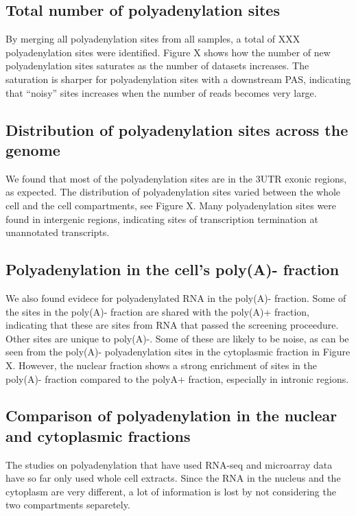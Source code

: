 \subsection{Total number of polyadenylation sites}
By merging all polyadenylation sites from all samples, a total of XXX
polyadenylation sites were identified. Figure X shows how the number of new
polyadenylation sites saturates as the number of datasets increases. The
saturation is sharper for polyadenylation sites with a downstream PAS,
indicating that ``noisy'' sites increases when the number of reads becomes very
large.

\subsection{Distribution of polyadenylation sites across the genome}
We found that most of the polyadenylation sites are in the 3\p UTR exonic
regions, as expected. The distribution of polyadenylation sites varied between
the whole cell and the cell compartments, see Figure X. Many polyadenylation
sites were found in intergenic regions, indicating sites of transcription
termination at unannotated transcripts.

\subsection{Polyadenylation in the cell's poly(A)- fraction}
We also found evidece for polyadenylated RNA in the poly(A)- fraction. Some of
the sites in the poly(A)- fraction are shared with the poly(A)+ fraction,
indicating that these are sites from RNA that passed the screening proceedure.
Other sites are unique to poly(A)-. Some of these are likely to be noise, as
can be seen from the poly(A)- polyadenylation sites in the cytoplasmic fraction
in Figure X. However, the nuclear fraction shows a strong enrichment of sites
in the poly(A)- fraction compared to the polyA+ fraction, especially in 
intronic regions.

\subsection{Comparison of polyadenylation in the nuclear and cytoplasmic
fractions}
The studies on polyadenylation that have used RNA-seq and microarray
data have so far only used whole cell extracts. Since the RNA in the nucleus
and the cytoplasm are very different, a lot of information is lost by not
considering the two compartments separetely. 

